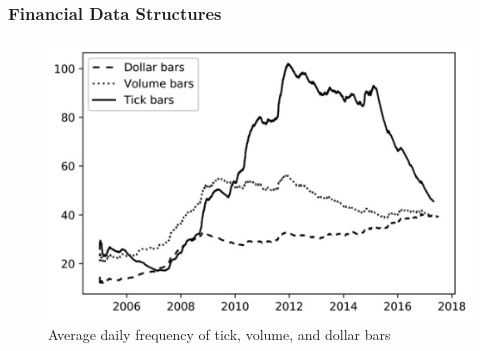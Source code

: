 \subsubsection{Financial Data Structures}

\begin{figure}[H]
\centering
\includegraphics[scale=0.55]{figures/intro/standardbars}
\caption{Average daily frequency of tick, volume, and dollar bars}
\end{figure}

